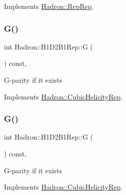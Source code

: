 Implements \mbox{\hyperlink{structHadron_1_1RepRep_a92c8802e5ed7afd7da43ccfd5b7cd92b}{Hadron\+::\+Rep\+Rep}}.

\mbox{\label{structHadron_1_1H1D2B1Rep_aa63b64ca5dfe557c9ea319ed68580acd}} 
\subsubsection{\texorpdfstring{G()}{G()}\hspace{0.1cm}{\footnotesize\ttfamily [1/3]}}
{\footnotesize\ttfamily int Hadron\+::\+H1\+D2\+B1\+Rep\+::G (\begin{DoxyParamCaption}{ }\end{DoxyParamCaption}) const\hspace{0.3cm}{\ttfamily [inline]}, {\ttfamily [virtual]}}

G-\/parity if it exists 

Implements \mbox{\hyperlink{structHadron_1_1CubicHelicityRep_a50689f42be1e6170aa8cf6ad0597018b}{Hadron\+::\+Cubic\+Helicity\+Rep}}.

\mbox{\label{structHadron_1_1H1D2B1Rep_aa63b64ca5dfe557c9ea319ed68580acd}} 
\subsubsection{\texorpdfstring{G()}{G()}\hspace{0.1cm}{\footnotesize\ttfamily [2/3]}}
{\footnotesize\ttfamily int Hadron\+::\+H1\+D2\+B1\+Rep\+::G (\begin{DoxyParamCaption}{ }\end{DoxyParamCaption}) const\hspace{0.3cm}{\ttfamily [inline]}, {\ttfamily [virtual]}}

G-\/parity if it exists 

Implements \mbox{\hyperlink{structHadron_1_1CubicHelicityRep_a50689f42be1e6170aa8cf6ad0597018b}{Hadron\+::\+Cubic\+Helicity\+Rep}}.

\mbox{\label{structHadron_1_1H1D2B1Rep_aa63b64ca5dfe557c9ea319ed68580acd}} 
